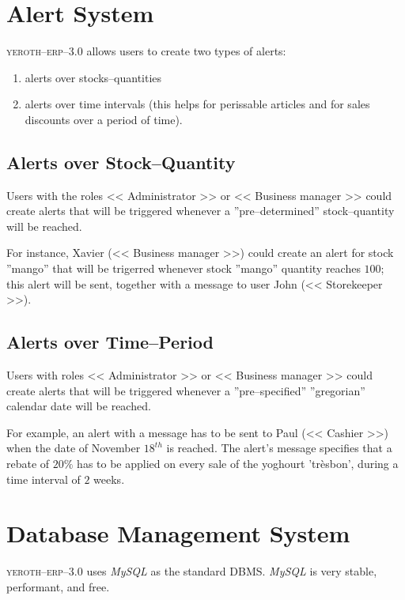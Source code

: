 \documentclass[a4paper, 10pt, twocolumn]{article}
\newcommand{\yeren}{\textsc{yeroth--erp--3.0}\xspace}
\newcommand{\administrator}{<< Administrator >>\xspace}
\newcommand{\manager}{<< Business manager >>\xspace}
\newcommand{\storekeeper}{<< Storekeeper >>\xspace}
\newcommand{\cashier}{<< Cashier >>\xspace}
\begin{document}
\vspace{-1.2em}
\section{Alert System}
\vspace{-0.3em}
\yeren allows users to create two types of alerts:
\begin{enumerate}[1)]
	\itemsep -0.5em
  \item alerts over stocks--quantities
  \item alerts over time intervals (this helps for
	  perissable articles and for sales discounts
	  over a period of time).
\end{enumerate}

\vspace{-1.1em}
\subsection{Alerts over Stock--Quantity}
\vspace{0em}
Users with the roles \administrator or \manager
could create alerts that will be triggered
whenever a ''pre--determined'' stock--quantity
will be reached.

For instance, Xavier (\manager) could create
an alert for stock ''mango'' that will be
trigerred whenever stock ''mango'' quantity
reaches $100$; this alert will be sent,
together with a message to user John (\storekeeper).

\vspace{-1.1em}
\subsection{Alerts over Time--Period}
\vspace{0em}
Users with roles \administrator or \manager
could create alerts that will be triggered
whenever a ''pre--specified'' ''gregorian''
calendar date will be reached.

For example, an alert with a message has to be
sent to Paul (\cashier) when the date of November
$18^{th}$ is reached. The alert's message
specifies that a rebate of $20\%$ has to be applied
on every sale of the yoghourt 'tr\`esbon', during a
time interval of $2$ weeks.

\vspace{-1.5em}
\section{Database Management System}
\vspace{-0.9em}
\yeren uses \emph{MySQL} as the standard DBMS. 
\emph{MySQL} is very stable, performant, and
free.
\end{document}
